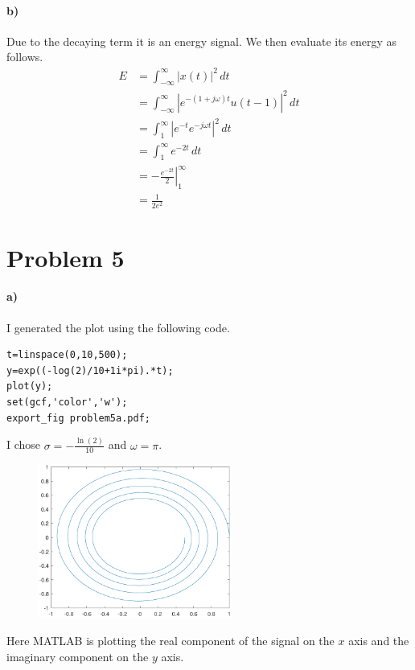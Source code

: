 \documentclass[12pt]{article}
\begin{document}
\paragraph{b)}

Due to the decaying term it is an energy signal. We then evaluate its energy as follows.
\begin{align*}
    E&=\int_{-\infty}^\infty |x(t)|^2\,dt\\
    &=\int_{-\infty}^\infty |e^{-(1+j\omega)t}u(t-1)|^2\,dt\\
    &=\int_1^\infty |e^{-t}e^{-j\omega t}|^2\,dt\\
    &=\int_1^\infty e^{-2t}\,dt\\
    &=\left. -\frac{e^{-2t}}{2}\right|_1^\infty\\
    &=\frac{1}{2e^2}
\end{align*}

\section*{Problem 5}

\paragraph{a)}

I generated the plot using the following code.
\begin{verbatim}
t=linspace(0,10,500);
y=exp((-log(2)/10+1i*pi).*t);
plot(y);
set(gcf,'color','w');
export_fig problem5a.pdf;
\end{verbatim}
I chose \(\sigma=-\frac{\ln(2)}{10}\) and \(\omega=\pi\).
\begin{figure}[H]
    \begin{center}
        \includegraphics[width=2.5in]{problem5a.pdf}
    \end{center}
\end{figure}
Here MATLAB is plotting the real component of the signal on the \(x\) axis and the imaginary component on the \(y\) axis.
\end{document}
